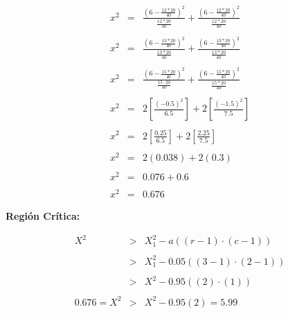 \documentclass{article}
\begin{document}
		\begin{equation*}
			\begin{array}{rcl}
			x^2 & = & \displaystyle \frac{\left(6 - \frac{12 * 20}{40}\right)^2}{\displaystyle \frac{12 * 20}{40}} + \displaystyle \frac{\left(6 - \frac{12 * 20}{40}\right)^2}{\displaystyle \frac{12 * 20}{40}}
			\\
			\\
			x^2 & = &\displaystyle \frac{\left(6 - \displaystyle \frac{13 * 20}{40}\right)^2}{\displaystyle \frac{13 * 20}{40}} + \displaystyle \frac{\left(6 -  \displaystyle \frac{13 * 20}{40}\right)^2}{\displaystyle \frac{13 * 20}{40}}
			\\
			\\
			x^2 & =& \displaystyle \frac{ \displaystyle \left(6 - \frac{15 * 20}{40}\right)^2}{ \displaystyle \frac{15 \cdot 20}{40}} + \displaystyle \frac{ \displaystyle \left(6 - \frac{15 * 20}{40}\right)^2}{\displaystyle \frac{15 * 20}{40}}
			\\
			\\
			x^2 & = & 2\left[\frac{\left(-0.5\right)^2}{6.5}\right] + 2\left[\frac{\left(-1.5\right)^2}{7.5}\right]
			\\
			\\
			x^2 & = & 2\left[\frac{0.25}{6.5}\right] + 2\left[\frac{2.25}{7.5}\right]
			\\
			\\
			x^2 & = & 2\left(0.038\right) + 2\left(0.3\right)
			\\
			\\
			x^2 & = & 0.076 + 0.6
			\\
			\\
			 x^2 & = & 0.676
			\end{array}
		\end{equation*}
		
		\begin{flushleft}
			\textbf{Regi\'on Cr\'itica:}
		\end{flushleft}
		
		\begin{equation*}    
		\begin{array}{rcl}
		X^2 & > & X_{1}^{2} - a \left(\left(r-1\right)\cdot \left(c-1\right)\right)\\\\
		 & > & X_{1}^{2} - 0.05 \left(\left(3-1\right)\cdot \left(2-1\right)\right)\\\\
		 & > & X^{2} - 0.95 \left(\left(2\right)\cdot \left(1\right)\right)\\\\
		0.676 = X^2 & > & X^{2} - 0.95 \left(2\right) = 5.99\\
		\end{array}
		\end{equation*}
		
\end{document}
